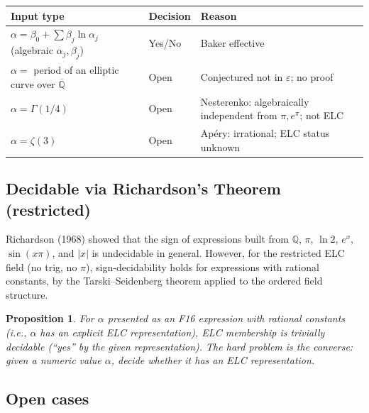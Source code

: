 \documentclass[11pt]{article}
\newtheorem{proposition}[theorem]{Proposition}
\begin{document}
\begin{center}
\renewcommand{\arraystretch}{1.2}
\begin{tabular}{lll}
\toprule
Input type & Decision & Reason \\
\midrule
$\alpha = \beta_0 + \sum \beta_j \ln \alpha_j$ (algebraic $\alpha_j, \beta_j$) & Yes/No & Baker effective \\
$\alpha = $ period of an elliptic curve over $\overline{\mathbb{Q}}$ & Open & Conjectured not in $\varepsilon$; no proof \\
$\alpha = \Gamma(1/4)$ & Open & Nesterenko: algebraically independent from $\pi, e^\pi$; not ELC \\
$\alpha = \zeta(3)$ & Open & Apéry: irrational; ELC status unknown \\
\bottomrule
\end{tabular}
\end{center}

\subsection{Decidable via Richardson's Theorem (restricted)}

Richardson (1968) showed that the sign of expressions built from $\mathbb{Q}$,
$\pi$, $\ln 2$, $e^x$, $\sin(x \pi)$, and $|x|$ is undecidable in general.
However, for the restricted ELC field (no trig, no $\pi$), sign-decidability holds
for expressions with rational constants, by the Tarski--Seidenberg theorem applied
to the ordered field structure.

\begin{proposition}
For $\alpha$ presented as an F16 expression with rational constants
(i.e., $\alpha$ has an explicit ELC representation), ELC membership is trivially
decidable (``yes'' by the given representation).
The hard problem is the \emph{converse}: given a numeric value $\alpha$,
decide whether it \emph{has} an ELC representation.
\end{proposition}

\subsection{Open cases}
\end{document}

